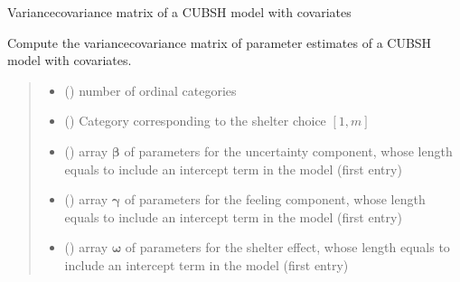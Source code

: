 \documentclass[letterpaper,10pt,english]{sphinxmanual}
\begin{document}
\begin{fulllineitems}
\label{\detokenize{cubmods:cubmods.cubsh_ywx.varcov}}
\pysigstartsignatures
{}
\pysigstopsignatures
\sphinxAtStartPar
Variance\sphinxhyphen{}covariance matrix of a CUBSH model with covariates

\sphinxAtStartPar
Compute the variance\sphinxhyphen{}covariance matrix of parameter estimates of a CUBSH model with covariates.
\begin{quote}\begin{description}
\begin{itemize}
\item {} 
\sphinxAtStartPar
{} () \textendash{} number of ordinal categories

\item {} 
\sphinxAtStartPar
{} () \textendash{} Category corresponding to the shelter choice \([1,m]\)

\item {} 
\sphinxAtStartPar
{} () \textendash{} array \(\pmb \beta\) of parameters for the uncertainty component, whose length equals 
 to include an intercept term in the model (first entry)

\item {} 
\sphinxAtStartPar
{} () \textendash{} array \(\pmb \gamma\) of parameters for the feeling component, whose length equals 
 to include an intercept term in the model (first entry)

\item {} 
\sphinxAtStartPar
{} () \textendash{} array \(\pmb \omega\) of parameters for the shelter effect, whose length equals 
 to include an intercept term in the model (first entry)


\end{itemize}
\end{description}
\end{quote}
\end{fulllineitems}
\end{document}
